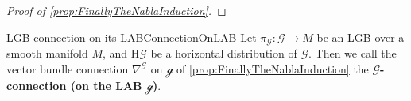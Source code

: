 \documentclass[reqno,a4paper,oneside]{amsart}
\newcommand\mutot{\mu_\caG}
\theoremstyle{plain}
\theoremstyle{remark}
\newtheorem{remark}[theorem]{Remarks}
\theoremstyle{definition}
\def\bas#1\eas{\begin{align*}#1\end{align*}}
\begin{document}
\begin{proof}[Proof of \ref{prop:FinallyTheNablaInduction}]
\end{proof}

\begin{definitions}{LGB connection on its LAB}{ConnectionOnLAB}
Let $\pi_{\mathcal{G}}\colon\mathcal{G} \to M$ be an LGB over a smooth manifold $M$, and $\mathrm{H}\mathcal{G}$ be a horizontal distribution of $\mathcal{G}$. Then we call the vector bundle connection $\nabla^{\mathcal{G}}$ on $\mathcal{g}$ of \ref{prop:FinallyTheNablaInduction} the \textbf{$\mathcal{G}$-connection (on the LAB $\mathcal{g}$)}.
\end{definitions}

\end{document}
